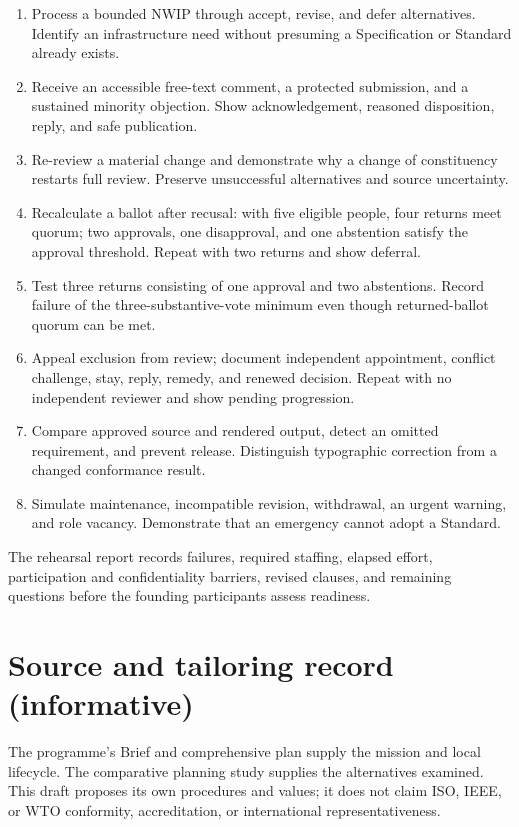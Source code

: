 \documentclass[11pt,a4paper]{article}
\begin{document}
\begin{enumerate}
\item Process a bounded NWIP through accept, revise, and defer alternatives. Identify an infrastructure need without presuming a Specification or Standard already exists.
\item Receive an accessible free-text comment, a protected submission, and a sustained minority objection. Show acknowledgement, reasoned disposition, reply, and safe publication.
\item Re-review a material change and demonstrate why a change of constituency restarts full review. Preserve unsuccessful alternatives and source uncertainty.
\item Recalculate a ballot after recusal: with five eligible people, four returns meet quorum; two approvals, one disapproval, and one abstention satisfy the approval threshold. Repeat with two returns and show deferral.
\item Test three returns consisting of one approval and two abstentions. Record failure of the three-substantive-vote minimum even though returned-ballot quorum can be met.
\item Appeal exclusion from review; document independent appointment, conflict challenge, stay, reply, remedy, and renewed decision. Repeat with no independent reviewer and show pending progression.
\item Compare approved source and rendered output, detect an omitted requirement, and prevent release. Distinguish typographic correction from a changed conformance result.
\item Simulate maintenance, incompatible revision, withdrawal, an urgent warning, and role vacancy. Demonstrate that an emergency cannot adopt a Standard.
\end{enumerate}
The rehearsal report records failures, required staffing, elapsed effort, participation and confidentiality barriers, revised clauses, and remaining questions before the founding participants assess readiness.

\section{Source and tailoring record (informative)}
The programme's Brief and comprehensive plan supply the mission and local lifecycle. The comparative planning study supplies the alternatives examined. This draft proposes its own procedures and values; it does not claim ISO, IEEE, or WTO conformity, accreditation, or international representativeness.
\end{document}
